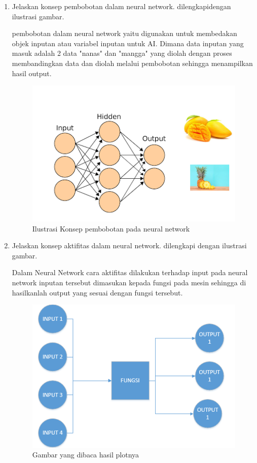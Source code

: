 \begin{enumerate}
\item Jelaskan konsep pembobotan  dalam neural network. dilengkapidengan ilustrasi gambar. \par
pembobotan dalam neural network yaitu digunakan untuk membedakan objek inputan atau 
variabel inputan untuk AI. Dimana data inputan yang masuk adalah 2 data "nanas" dan "mangga" 
yang diolah dengan proses membandingkan data dan diolah melalui pembobotan sehingga menampilkan hasil output.

\begin{figure}[ht]
\centering
\includegraphics[scale=0.5]{figures/1174012/chapter6/1,3.PNG}
\caption{Ilustrasi Konsep pembobotan pada neural network}
\label{contoh}
\end{figure}

\item Jelaskan konsep aktifitas dalam neural network. dilengkapi dengan ilustrasi gambar.\par
Dalam Neural Network cara aktifitas dilakukan terhadap input pada neural network inputan tersebut dimasukan kepada 
fungsi pada mesin sehingga di hasilkanlah output yang sesuai dengan fungsi tersebut.

\begin{figure}[ht]
\centering
\includegraphics[scale=0.5]{figures/1174012/chapter6/1,4.PNG}
\caption{Gambar yang dibaca hasil plotnya}
\label{contoh}
\end{figure}


\end{enumerate}
